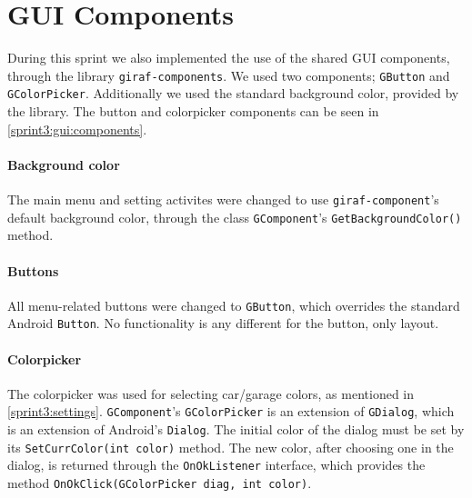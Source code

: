 \section{GUI Components}\label{sprint3:gui}
During this sprint we also implemented the use of the shared GUI components, through the library \lstinline|giraf-components|.
We used two components; \lstinline|GButton| and \lstinline|GColorPicker|.
Additionally we used the standard background color, provided by the library.
The button and colorpicker components can be seen in \cref{sprint3:gui:components}.

\paragraph{Background color}
The main menu and setting activites were changed to use \lstinline|giraf-component|'s default background color, through the class \lstinline|GComponent|'s \lstinline|GetBackgroundColor()| method.

\paragraph{Buttons}
All menu-related buttons were changed to \lstinline|GButton|, which overrides the standard Android \lstinline|Button|.
No functionality is any different for the button, only layout.

\paragraph{Colorpicker}
The colorpicker was used for selecting car/garage colors, as mentioned in \cref{sprint3:settings}.
\lstinline|GComponent|'s \lstinline|GColorPicker| is an extension of \lstinline|GDialog|, which is an extension of Android's \lstinline|Dialog|.
The initial color of the dialog must be set by its \lstinline|SetCurrColor(int color)| method.
The new color, after choosing one in the dialog, is returned through the \lstinline|OnOkListener| interface, which provides the method \lstinline|OnOkClick(GColorPicker diag, int color)|.